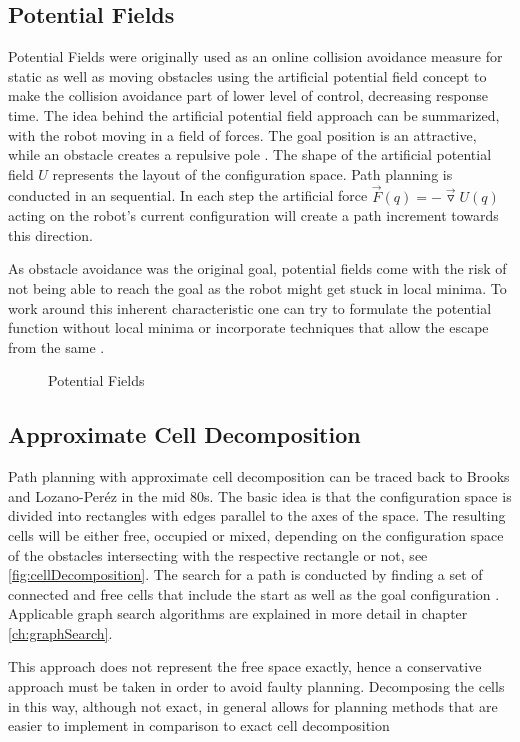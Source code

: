 \subsection{Potential Fields}
Potential Fields were originally used as an online collision avoidance measure for static as well as moving obstacles using the artificial potential field concept to make the collision avoidance part of lower level of control, decreasing response time. The idea behind the artificial potential field approach can be summarized, with the robot moving in a field of forces. The goal position is an attractive, while an obstacle creates a repulsive pole \cite{Khatib.1986}. The shape of the artificial potential field $U$ represents the layout of the configuration space. Path planning is conducted in an sequential. In each step the artificial force $\vec{F}(q) = -\vec{\triangledown}U(q)$ acting on the robot's current configuration will create a path increment towards this direction.

As obstacle avoidance was the original goal, potential fields come with the risk of not being able to reach the goal as the robot might get stuck in local minima. To work around this inherent characteristic one can try to formulate the potential function without local minima or incorporate techniques that allow the escape from the same \cite{Latombe.1991}.

\begin{figure}[h]
    \caption{Potential Fields}
    \label{fig:potentialFields}
\end{figure}

\subsection{Approximate Cell Decomposition}
Path planning with approximate cell decomposition can be traced back to Brooks and Lozano-Peréz in the mid 80s. The basic idea is that the configuration space is divided into rectangles with edges parallel to the axes of the space. The resulting cells will be either free, occupied or mixed, depending on the configuration space of the obstacles intersecting with the respective rectangle or not, see \ref{fig:cellDecomposition}. The search for a path is conducted by finding a set of connected and free cells that include the start as well as the goal configuration \cite{Brooks.1985}. Applicable graph search algorithms are explained in more detail in chapter \ref{ch:graphSearch}.

This approach does not represent the free space exactly, hence a conservative approach must be taken in order to avoid faulty planning. Decomposing the cells in this way, although not exact, in general allows for planning methods that are easier to implement in comparison to exact cell decomposition \cite{Latombe.1991}

